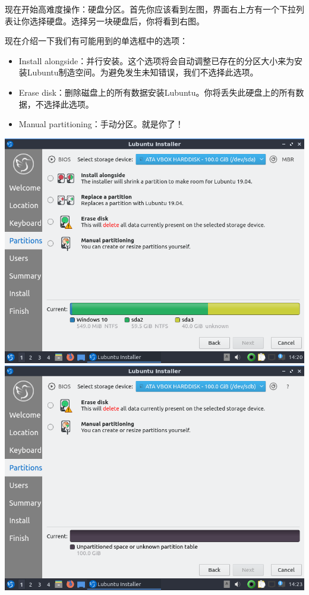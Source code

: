 现在开始高难度操作：硬盘分区。首先你应该看到左图，界面右上方有一个下拉列表让你选择硬盘。选择另一块硬盘后，你将看到右图。\par
现在介绍一下我们有可能用到的单选框中的选项：
\begin{itemize}
	\item Install alongside：并行安装。这个选项将会自动调整已存在的分区大小来为安装Lubuntu制造空间。为避免发生未知错误，我们不选择此选项。
	\item Erase disk：删除磁盘上的所有数据安装Lubuntu。你将丢失此硬盘上的所有数据，不选择此选项。
	\item Manual partitioning：手动分区。就是你了！
\end{itemize}
\begin{center}
	\includegraphics[scale=0.4]{pic/lubinst6}	\includegraphics[scale=0.4]{pic/lubinst7}
\end{center} \par
